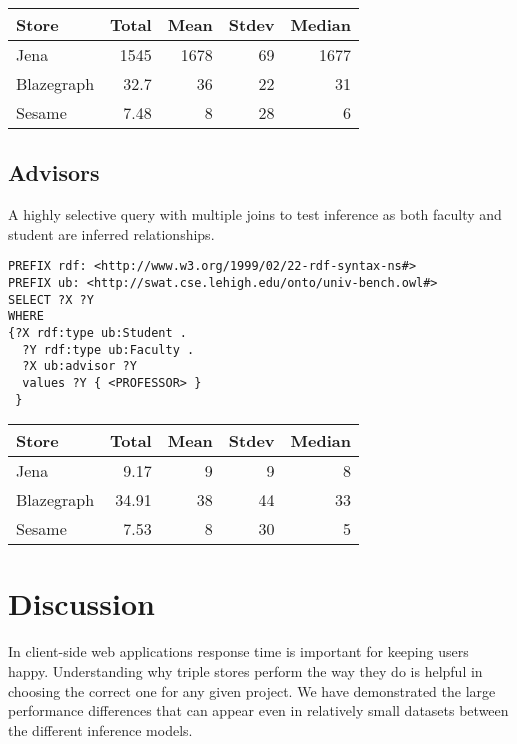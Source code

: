\documentclass{llncs}
\begin{document}
\begin{tabular}{l | r r r r } Store & Total & Mean & Stdev & Median \\ \hline Jena & 1545 & 1678 & 69 & 1677 \\ Blazegraph & 32.7 & 36 & 22 & 31 \\ Sesame & 7.48 & 8 & 28 & 6 \end{tabular}

\subsection{Advisors}

A highly selective query with multiple joins to test inference as both faculty and student are inferred relationships.

\begin{lstlisting}
PREFIX rdf: <http://www.w3.org/1999/02/22-rdf-syntax-ns#>
PREFIX ub: <http://swat.cse.lehigh.edu/onto/univ-bench.owl#>
SELECT ?X ?Y
WHERE
{?X rdf:type ub:Student .
  ?Y rdf:type ub:Faculty .
  ?X ub:advisor ?Y 
  values ?Y { <PROFESSOR> }
 }
\end{lstlisting}

\begin{tabular}{l | r r r r } Store & Total & Mean & Stdev & Median \\ \hline Jena & 9.17 & 9 & 9 & 8 \\ Blazegraph & 34.91 & 38 & 44 & 33 \\ Sesame & 7.53 & 8 & 30 & 5 \end{tabular}

\section{Discussion}
In client-side web applications response time is important for keeping users happy.  Understanding why triple stores perform the way they do is helpful in choosing the correct one for any given project.  We have demonstrated the large performance differences that can appear even in relatively small datasets between the different inference models.



\end{document}
